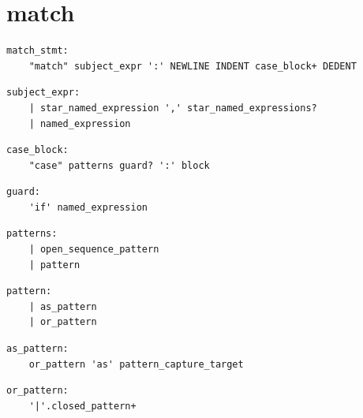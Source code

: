 \section{match}

\noindent\textbf{\texttt{}}\par
\begin{lstlisting}
match_stmt:
    "match" subject_expr ':' NEWLINE INDENT case_block+ DEDENT
\end{lstlisting}

\noindent\textbf{\texttt{}}\par
\begin{lstlisting}
subject_expr:
    | star_named_expression ',' star_named_expressions?
    | named_expression
\end{lstlisting}

\noindent\textbf{\texttt{}}\par
\begin{lstlisting}
case_block:
    "case" patterns guard? ':' block
\end{lstlisting}

\noindent\textbf{\texttt{}}\par
\begin{lstlisting}
guard:
    'if' named_expression
\end{lstlisting}

\noindent\textbf{\texttt{}}\par
\begin{lstlisting}
patterns:
    | open_sequence_pattern
    | pattern
\end{lstlisting}

\noindent\textbf{\texttt{}}\par
\begin{lstlisting}
pattern:
    | as_pattern
    | or_pattern
\end{lstlisting}

\noindent\textbf{\texttt{}}\par
\begin{lstlisting}
as_pattern:
    or_pattern 'as' pattern_capture_target
\end{lstlisting}

\noindent\textbf{\texttt{}}\par
\begin{lstlisting}
or_pattern:
    '|'.closed_pattern+
\end{lstlisting}

